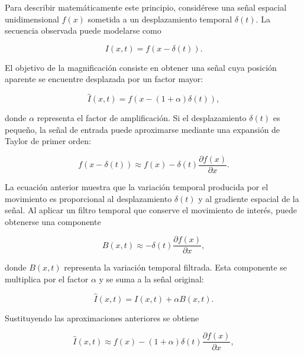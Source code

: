 Para describir matemáticamente este principio, considérese una señal espacial unidimensional $f(x)$ sometida a un desplazamiento temporal $\delta(t)$. La secuencia observada puede modelarse como

\begin{equation}
    I(x,t)=f\left(x-\delta(t)\right).
    \label{eq:modelo_euleriano}
\end{equation}

El objetivo de la magnificación consiste en obtener una señal cuya posición aparente se encuentre desplazada por un factor mayor:

\begin{equation}
    \widehat{I}(x,t)
    =
    f\left(x-(1+\alpha)\delta(t)\right),
    \label{eq:objetivo_magnificacion_euleriana}
\end{equation}

donde $\alpha$ representa el factor de amplificación. Si el desplazamiento $\delta(t)$ es pequeño, la señal de entrada puede aproximarse mediante una expansión de Taylor de primer orden:

\begin{equation}
    f\left(x-\delta(t)\right)
    \approx
    f(x)-\delta(t)\frac{\partial f(x)}{\partial x}.
    \label{eq:taylor_euleriano}
\end{equation}

La ecuación anterior muestra que la variación temporal producida por el movimiento es proporcional al desplazamiento $\delta(t)$ y al gradiente espacial de la señal. Al aplicar un filtro temporal que conserve el movimiento de interés, puede obtenerse una componente

\begin{equation}
    B(x,t)
    \approx
    -\delta(t)\frac{\partial f(x)}{\partial x},
    \label{eq:senal_temporal_filtrada}
\end{equation}

donde $B(x,t)$ representa la variación temporal filtrada. Esta componente se multiplica por el factor $\alpha$ y se suma a la señal original:

\begin{equation}
    \widehat{I}(x,t)
    =
    I(x,t)+\alpha B(x,t).
    \label{eq:suma_euleriana}
\end{equation}

Sustituyendo las aproximaciones anteriores se obtiene

\begin{equation}
    \widehat{I}(x,t)
    \approx
    f(x)
    -
    (1+\alpha)\delta(t)
    \frac{\partial f(x)}{\partial x},
    \label{eq:salida_taylor_euleriana}
\end{equation}

